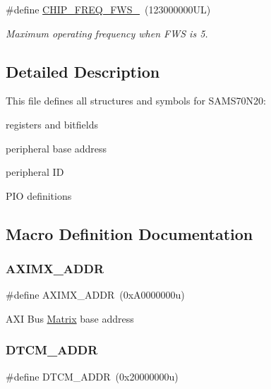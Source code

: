 \begin{DoxyCompactItemize}
\mbox{\label{group__SAMS70N20__definitions_ga3b66824f858591135877b369f98d48a5}} 
\#define \mbox{\hyperlink{group__SAMS70N20__definitions_ga3b66824f858591135877b369f98d48a5}{C\+H\+I\+P\+\_\+\+F\+R\+E\+Q\+\_\+\+F\+W\+S\+\_}}~(123000000\+U\+L)
\begin{DoxyCompactList}\small\item\em Maximum operating frequency when F\+WS is 5. \end{DoxyCompactList}\end{DoxyCompactItemize}


\subsection{Detailed Description}
This file defines all structures and symbols for S\+A\+M\+S70\+N20\+:
\begin{DoxyItemize}
\item registers and bitfields
\item peripheral base address
\item peripheral ID
\item P\+IO definitions 
\end{DoxyItemize}

\subsection{Macro Definition Documentation}
\mbox{\label{group__SAMS70N20__definitions_ga2fb7cc681bf5e7fbce5e3635b72a330a}} 
\subsubsection{\texorpdfstring{AXIMX\_ADDR}{AXIMX\_ADDR}}
{\footnotesize\ttfamily \#define A\+X\+I\+M\+X\+\_\+\+A\+D\+DR~(0x\+A0000000u)}

A\+XI Bus \mbox{\hyperlink{structMatrix}{Matrix}} base address \mbox{\label{group__SAMS70N20__definitions_ga26626a425f7ebb3a0c2dbc276f0d9f78}} 
\subsubsection{\texorpdfstring{DTCM\_ADDR}{DTCM\_ADDR}}
{\footnotesize\ttfamily \#define D\+T\+C\+M\+\_\+\+A\+D\+DR~(0x20000000u)}

